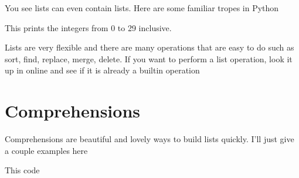 \documentclass[letterpaper,10pt,english]{jupyterBook}
\begin{document}
\begin{sphinxVerbatim}[commandchars=\\\{\}]
\PYG{p}{[}  \PYG{p}{]}
\end{sphinxVerbatim}

\sphinxAtStartPar
You see lists can even contain lists. Here are some familiar tropes in Python

\begin{sphinxVerbatim}[commandchars=\\\{\}]
  \PYG{p}{[}\PYG{p}{]} 
   
	\PYG{p}{[}\PYG{p}{]}    
   
	 
   
	    \PYG{p}{[}\PYG{p}{]} 
\end{sphinxVerbatim}

\sphinxAtStartPar
This prints the integers from 0 to 29 inclusive.

\sphinxAtStartPar
Lists are very flexible and there are many operations that are easy to do such as sort, find, replace, merge, delete. If you want to perform a list operation, look it up in online and see if it is already a built\sphinxhyphen{}in operation


\section{Comprehensions}
\label{\detokenize{lessons/jupyter-python-intro:comprehensions}}
\sphinxAtStartPar
Comprehensions are beautiful and lovely ways to build lists quickly. I’ll just give a couple examples here

\sphinxAtStartPar
This code

\begin{sphinxVerbatim}[commandchars=\\\{\}]
  \PYG{p}{[}\PYG{p}{]}
   
\end{sphinxVerbatim}
\end{document}
